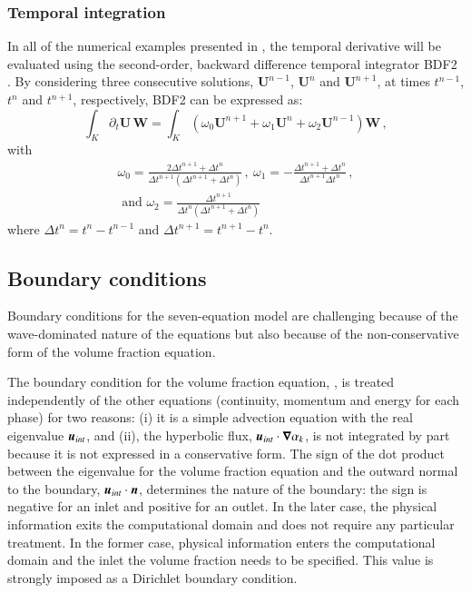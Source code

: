 \documentclass[preprint,10pt]{elsarticle}
\begin{document}
\subsubsection{Temporal integration} 
%
In all of the numerical examples presented in , the temporal derivative  will be 
evaluated using the second-order, backward difference temporal integrator BDF2 \cite{bdf2}. By considering three 
consecutive solutions, $\mathbf U^{n-1}$, $\mathbf U^n$ and $\mathbf U^{n+1}$, at times $t^{n-1}$, $t^n$ and $t^{n+1}$, respectively, BDF2 can be 
expressed as:
\begin{equation}
\label{eq:BDF2}
\int_{K} \partial_t \mathbf U \, \mathbf  W = \int_{K} \left( \omega_0 \mathbf U^{n+1}  + \omega_1 \mathbf U^n + \omega_2 \mathbf U^{n-1} \right) \mathbf W \,,
\end{equation}
%
with
\begin{multline}
\omega_0 =\frac{2\Delta t^{n+1}+\Delta t^n}{\Delta t^{n+1} \left( \Delta t^{n+1}+\Delta t^n \right)} \, , \ 
\omega_1 = -\frac{\Delta t^{n+1}+\Delta t^n}{\Delta t^{n+1} \Delta t^n}  \, , \\
\text{ and } \omega_2 = \frac{\Delta t^{n+1}}{\Delta t^n \left( \Delta t^{n+1} + \Delta t^n \right)} \nonumber
\end{multline}
where $\Delta t^{n} = t^n-t^{n-1}$ and $\Delta t^{n+1} = t^{n+1}-t^{n}$.
%
\subsection{Boundary conditions} \label{sec:bc}
%
Boundary conditions for the seven-equation model are challenging because of the wave-dominated nature of the equations but also because of the 
non-conservative form of the volume fraction equation. 

The boundary condition for the volume fraction equation, , is treated independently of the other equations (continuity, momentum 
and energy for each phase) for two reasons: (i) it is a simple advection equation with the real eigenvalue $\boldsymbol u_{int}$, and (ii), the hyperbolic flux, 
$\boldsymbol u_{int} \cdot \boldsymbol\nabla \alpha_k$, is not integrated by part because it is not expressed in a conservative form. 
The sign of the dot product between the eigenvalue for the volume fraction equation and the outward normal to the boundary, $\boldsymbol u_{int} \cdot \boldsymbol n$, determines 
the nature of the boundary: the sign is negative for an inlet and positive for an outlet. In the later case, the physical information exits the computational domain and 
does not require any particular treatment. In the former case, physical information enters the computational domain and the inlet the volume fraction needs to be specified.
This value is strongly imposed as a Dirichlet boundary condition.
\end{document}
